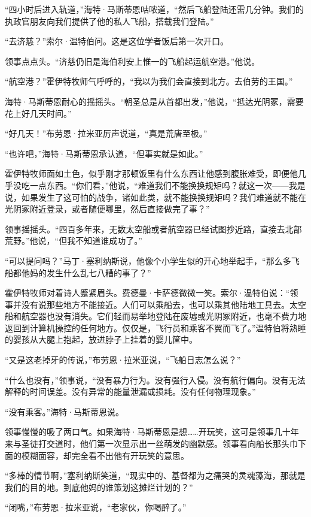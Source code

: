 \documentclass[AutoFakeBold=true]{book}
\begin{document}
``四小时后进入轨道，''海特·马斯蒂恩咕哝道，``然后飞船登陆还需几分钟。我们的执政官朋友向我们提供了他的私人飞船，搭载我们登陆。''

``去济慈？''索尔·温特伯问。这是这位学者饭后第一次开口。

领事点点头。``济慈仍旧是海伯利安上惟一的飞船起运航空港。''他说。

``航空港？''霍伊特牧师气呼呼的，``我以为我们会直接到北方。去伯劳的王国。''

海特·马斯蒂恩耐心的摇摇头。``朝圣总是从首都出发，''他说，``抵达光阴冢，需要花上好几天时间。''

``好几天！''布劳恩·拉米亚厉声说道，``真是荒唐至极。''

``也许吧，''海特·马斯蒂恩承认道，``但事实就是如此。''

霍伊特牧师面如土色，似乎刚才那顿饭里有什么东西让他感到腹胀难受，即便他几乎没吃一点东西。``你们看，''他说，``难道我们不能换换规矩吗？就这一次——我是说，如果发生了这可怕的战争，诸如此类，就不能换换规矩吗？我们难道就不能在光阴冢附近登录，或者随便哪里，然后直接做完了事？''

领事摇摇头。``四百多年来，无数太空船或者航空器已经试图抄近路，直接去北部荒野。''他说，``但我不知道谁成功了。''

``可以提问吗？''马丁·塞利纳斯说，他像个小学生似的开心地举起手，``那么多飞船都他妈的发生什么乱七八糟的事了？''

霍伊特牧师对着诗人蹙紧眉头。费德曼·卡萨德微微一笑。索尔·温特伯说：``领事并没有说那些地方不能接近。人们可以乘船去，也可以乘其他陆地工具去。太空船和航空器也没有消失。它们轻而易举地登陆在废墟或光阴冢附近，也毫不费力地返回到计算机操控的任何地方。仅仅是，飞行员和乘客不翼而飞了。''温特伯将熟睡的婴孩从大腿上抱起，放进脖子上挂着的婴儿筐中。

``又是这老掉牙的传说，''布劳恩·拉米亚说，``飞船日志怎么说？''

``什么也没有，''领事说，``没有暴力行为。没有强行入侵。没有航行偏向。没有无法解释的时间误差。没有异常的能量泄漏或损耗。没有任何物理现象。''

``没有乘客。''海特·马斯蒂恩说。

领事慢慢的吸了两口气。如果海特·马斯蒂恩是想……开玩笑，这可是领事几十年来与圣徒打交道时，他们第一次显示出一丝萌发的幽默感。领事看向船长那头巾下面的模糊面容，却完全看不出他有开玩笑的意思。

``多棒的情节啊，''塞利纳斯笑道，``现实中的、基督都为之痛哭的灵魂藻海，那就是我们的目的地。到底他妈的谁策划这摊烂计划的？''

``闭嘴，''布劳恩·拉米亚说，``老家伙，你喝醉了。''
\end{document}
